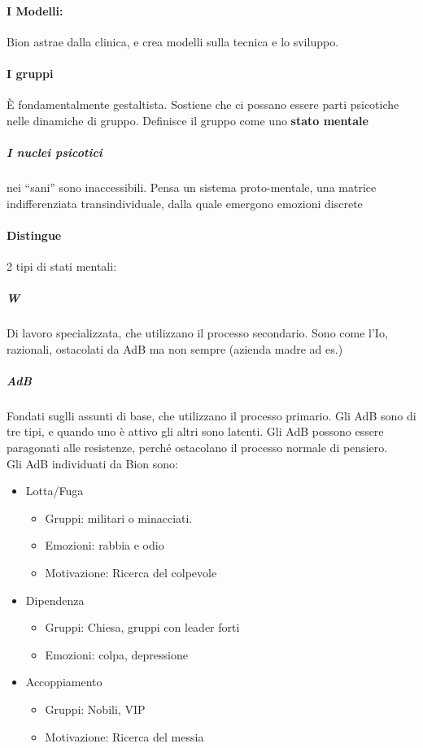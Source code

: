 \documentclass[12pt, a4paper]{article}
\begin{document}
\paragraph{I Modelli:} Bion astrae dalla clinica, e crea modelli sulla tecnica e lo sviluppo.

\paragraph{I gruppi} \`E fondamentalmente gestaltista. Sostiene che ci possano essere parti psicotiche nelle dinamiche di gruppo.
Definisce il gruppo come uno \textbf{stato mentale}

\subparagraph{I nuclei psicotici} nei ``sani'' sono inaccessibili.
Pensa un sistema proto-mentale, una matrice indifferenziata transindividuale, dalla quale emergono emozioni discrete

\paragraph{Distingue} 2 tipi di stati mentali:

\subparagraph{W} Di lavoro specializzata, che utilizzano il processo secondario. Sono come l'Io, razionali, ostacolati da AdB ma non sempre (azienda madre ad es.)

\subparagraph{AdB} Fondati suglli assunti di base, che utilizzano il processo primario. Gli AdB sono di tre tipi, e quando uno \`e attivo gli altri sono latenti. Gli AdB possono essere paragonati alle resistenze, perch\'e ostacolano il processo normale di pensiero. \\ Gli AdB individuati da Bion sono:
\begin{itemize}
    \item Lotta/Fuga
        \begin{itemize}
            \item Gruppi: militari o minacciati.
            \item Emozioni: rabbia e odio
            \item Motivazione: Ricerca del colpevole
        \end{itemize}
    \item Dipendenza
        \begin{itemize}
            \item Gruppi: Chiesa, gruppi con leader forti
            \item Emozioni: colpa, depressione
        \end{itemize}
    \item Accoppiamento
        \begin{itemize}
            \item Gruppi: Nobili, VIP
            \item Motivazione: Ricerca del messia
        \end{itemize}
\end{itemize}
\end{document}
